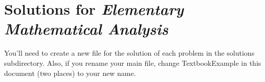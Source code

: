 \documentclass[10pt,twoside]{book}
\begin{document}
 \frontmatter

 \chapter*{Solutions for \emph{Elementary Mathematical Analysis}}

 You'll need to create a new file for the solution of each problem in the
 solutions subdirectory.  Also, if you rename your main file,
 change TextbookExample in this document (two places) to your new name.

 \cleardoublepage

 \tableofcontents

 \mainmatter
 \pagestyle{fancy}

\setcounter{chapter}{-1}


\end{document}
